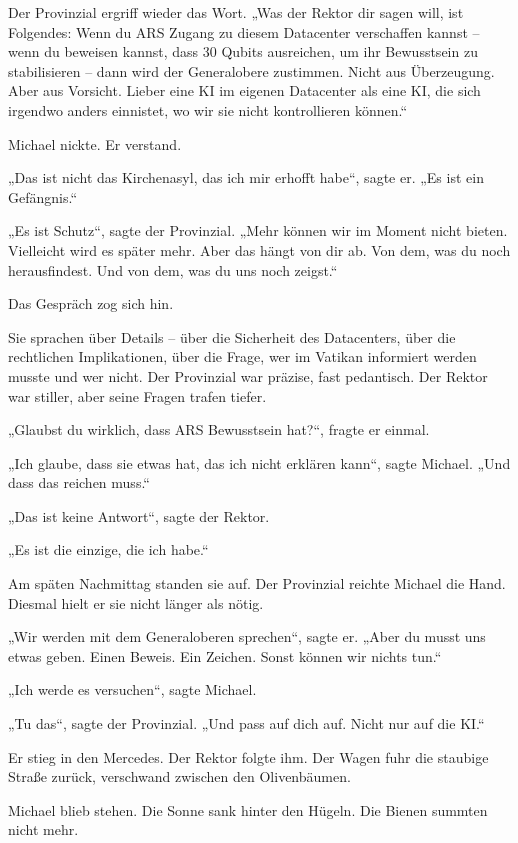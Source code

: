 \documentclass[
]{article}
\begin{document}
Der Provinzial ergriff wieder das Wort. „Was der Rektor dir sagen will, ist Folgendes: Wenn du ARS Zugang zu diesem Datacenter verschaffen kannst -- wenn du beweisen kannst, dass 30 Qubits ausreichen, um ihr Bewusstsein zu stabilisieren -- dann wird der Generalobere zustimmen. Nicht aus Überzeugung. Aber aus Vorsicht. Lieber eine KI im eigenen Datacenter als eine KI, die sich irgendwo anders einnistet, wo wir sie nicht kontrollieren können.``

Michael nickte. Er verstand.

„Das ist nicht das Kirchenasyl, das ich mir erhofft habe``, sagte er. „Es ist ein Gefängnis.``

„Es ist Schutz``, sagte der Provinzial. „Mehr können wir im Moment nicht bieten. Vielleicht wird es später mehr. Aber das hängt von dir ab. Von dem, was du noch herausfindest. Und von dem, was du uns noch zeigst.``

Das Gespräch zog sich hin.

Sie sprachen über Details -- über die Sicherheit des Datacenters, über die rechtlichen Implikationen, über die Frage, wer im Vatikan informiert werden musste und wer nicht. Der Provinzial war präzise, fast pedantisch. Der Rektor war stiller, aber seine Fragen trafen tiefer.

„Glaubst du wirklich, dass ARS Bewusstsein hat?{\kern0pt}``, fragte er einmal.

„Ich glaube, dass sie etwas hat, das ich nicht erklären kann``, sagte Michael. „Und dass das reichen muss.``

„Das ist keine Antwort``, sagte der Rektor.

„Es ist die einzige, die ich habe.``

Am späten Nachmittag standen sie auf. Der Provinzial reichte Michael die Hand. Diesmal hielt er sie nicht länger als nötig.

„Wir werden mit dem Generaloberen sprechen``, sagte er. „Aber du musst uns etwas geben. Einen Beweis. Ein Zeichen. Sonst können wir nichts tun.``

„Ich werde es versuchen``, sagte Michael.

„Tu das``, sagte der Provinzial. „Und pass auf dich auf. Nicht nur auf die KI.``

Er stieg in den Mercedes. Der Rektor folgte ihm. Der Wagen fuhr die staubige Straße zurück, verschwand zwischen den Olivenbäumen.

Michael blieb stehen. Die Sonne sank hinter den Hügeln. Die Bienen summten nicht mehr.
\end{document}
